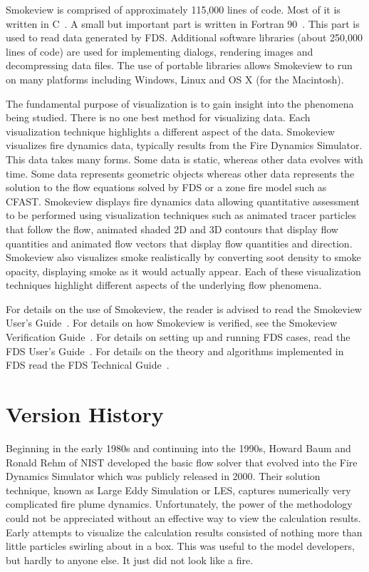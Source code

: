 \documentclass[11pt,twoside]{book}
\begin{document}
Smokeview is comprised of approximately 115,000 lines of code.
Most of it is written in C~\cite{C:book}. A small but important
part is written in Fortran 90~\cite{Fortran:book}.  This part is
used to read data generated by FDS.  Additional software libraries
(about 250,000 lines of code) are used for implementing dialogs,
rendering images and decompressing data files. The use of portable
libraries allows Smokeview to run on many platforms including
Windows, Linux and OS X (for the Macintosh).

The fundamental purpose of visualization is to gain insight into
the phenomena being studied. There is no one best method for
visualizing data. Each visualization technique highlights a
different aspect of the data. Smokeview visualizes fire dynamics
data, typically results from the Fire Dynamics Simulator. This
data takes many forms.  Some data is static, whereas other data
evolves with time. Some data represents geometric objects whereas
other data represents the solution to the flow equations solved by
FDS or a zone fire model such as CFAST. Smokeview displays fire
dynamics data allowing quantitative assessment to be performed
using visualization techniques such as animated tracer particles
that follow the flow, animated shaded 2D and 3D contours that
display flow quantities and animated flow vectors that display
flow quantities and direction. Smokeview also visualizes smoke
realistically by converting soot density to smoke opacity,
displaying smoke as it would actually appear. Each of these
visualization techniques highlight different aspects of the
underlying flow phenomena.

For details on the use of Smokeview, the reader is advised to read
the Smokeview User's Guide~\cite{Smokeview_Users_Guide}. For
details on how Smokeview is verified, see the Smokeview
Verification Guide~\cite{Smokeview_Verification_Guide}.  For
details on setting up and running FDS cases, read the FDS User's
Guide~\cite{FDS_Users_Guide}.  For details on the theory and
algorithms implemented in FDS read the FDS Technical
Guide~\cite{FDS_Tech_Guide}.

%
%

\section{Version History}

Beginning in the early 1980s and continuing into the 1990s, Howard Baum and Ronald Rehm of NIST developed the basic flow solver that evolved into the Fire Dynamics Simulator which was publicly released in 2000\cite{McGrattan:6}.  Their solution technique, known as Large Eddy Simulation or LES, captures numerically very complicated fire plume dynamics.  Unfortunately, the power of the methodology could not be appreciated without an effective way to view the calculation results.  Early attempts to visualize the calculation results consisted of nothing more than little particles swirling about in a box.  This was useful to the model developers, but hardly to anyone else.  It just did not look like a fire.
\end{document}
